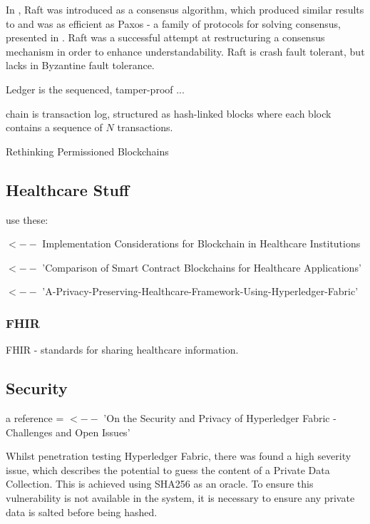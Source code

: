 In \cite{ongaro_search_2014}, Raft was introduced as a consensus algorithm, which produced similar results to and was as efficient as Paxos - a family of protocols for solving consensus, presented in \cite{pease_reaching_1980}.
Raft was a successful attempt at restructuring a consensus mechanism in order to enhance understandability. Raft is crash fault tolerant, but lacks in Byzantine fault tolerance. \cite{ongaro_search_2014} 


Ledger is the sequenced, tamper-proof ... 

chain is transaction log, structured as hash-linked blocks where each block contains a sequence of $N$ transactions.

Rethinking Permissioned Blockchains \cite{vukolic_rethinking_2017} 

\subsection{Healthcare Stuff} %


use these: 

\cite{paranjape_implementation_2019} $ <-- $ Implementation Considerations for Blockchain in Healthcare Institutions

\cite{yu_comparison_2020} $<--$ 'Comparison of Smart Contract Blockchains for Healthcare Applications'

\cite{stamatellis_privacy-preserving_2020} $<--$ 'A-Privacy-Preserving-Healthcare-Framework-Using-Hyperledger-Fabric'

\subsubsection{FHIR}
FHIR - standards for sharing healthcare information.\linebreak[1]

\subsection{Security}

a reference = \cite{brotsis_security_2020} $<--$ 'On the Security and Privacy of Hyperledger Fabric - Challenges and Open Issues'

Whilst penetration testing Hyperledger Fabric, there was found a high severity issue, which describes the potential to guess the content of a Private Data Collection.
This is achieved using SHA256 as an oracle. To ensure this vulnerability is not available in the system, it is necessary to ensure any private data is salted before being hashed. \cite{shaw_penetration_2019}

